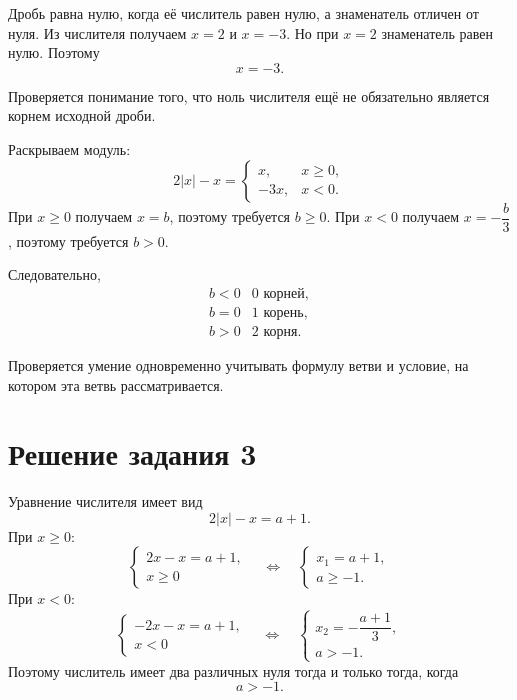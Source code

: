 \clearpage
{}

\begin{teacheranswer}[Задание 1]
  Дробь равна нулю, когда её числитель равен нулю, а знаменатель отличен
  от нуля. Из числителя получаем \(x=2\) и \(x=-3\). Но при \(x=2\)
  знаменатель равен нулю. Поэтому
  \[
    \boxed{x=-3}.
  \]
\end{teacheranswer}

\begin{criterionbox}
  Проверяется понимание того, что ноль числителя ещё не обязательно является
  корнем исходной дроби.
\end{criterionbox}

\begin{teacheranswer}[Задание 2]
  Раскрываем модуль:
  \[
    2|x|-x=
    \begin{cases}
      x, & x\ge 0,\\
      -3x, & x<0.
    \end{cases}
  \]
  При \(x\ge0\) получаем \(x=b\), поэтому требуется \(b\ge0\). При
  \(x<0\) получаем \(x=-\dfrac b3\), поэтому требуется \(b>0\).

  Следовательно,
  \[
    \begin{array}{c|c}
      b<0 & 0\text{ корней},\\
      b=0 & 1\text{ корень},\\
      b>0 & 2\text{ корня}.
    \end{array}
  \]
\end{teacheranswer}

\begin{criterionbox}
  Проверяется умение одновременно учитывать формулу ветви и условие,
  на котором эта ветвь рассматривается.
\end{criterionbox}

\clearpage
\section*{Решение задания 3}

\begin{teacheranswer}
  Уравнение числителя имеет вид
  \[
    2|x|-x=a+1.
  \]
  При \(x\ge0\):
  \[
    \begin{cases}
      2x-x=a+1,\\
      x\ge0
    \end{cases}
    \quad\Longleftrightarrow\quad
    \begin{cases}
      x_1=a+1,\\
      a\ge-1.
    \end{cases}
  \]
  При \(x<0\):
  \[
    \begin{cases}
      -2x-x=a+1,\\
      x<0
    \end{cases}
    \quad\Longleftrightarrow\quad
    \begin{cases}
      x_2=-\dfrac{a+1}{3},\\
      a>-1.
    \end{cases}
  \]
  Поэтому числитель имеет два различных нуля тогда и только тогда, когда
  \[
    a>-1.
  \]
\end{teacheranswer}

